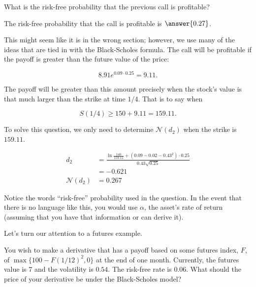 \documentclass{ximera}
\begin{document}
\begin{question}
What is the risk-free probability that the previous call is profitable?

The risk-free probability that the call is profitable is $\answer{0.27}$.
\end{question}

\begin{solution}
This might seem like it is in the wrong section; however, we use many of the ideas that are tied in with the Black-Scholes formula. The call will be profitable if the payoff is greater than the future value of the price:

	\begin{equation*}
	8.91e^{0.09\cdot 0.25}=9.11.
	\end{equation*}

The payoff will be greater than this amount precisely when the stock's value is that much larger than the strike at time $1/4$. That is to say when
	
	\begin{equation*}
	S(1/4)\geq 150+9.11=159.11.
	\end{equation*}

To solve this question, we only need to determine $\mathcal{N}(d_2)$ when the strike is $159.11$.

	\begin{align*}
	d_2 			&=\frac{\ln\frac{140}{159.11}+(0.09-0.02-0.43^2)\cdot 0.25}{0.43\sqrt{0.25}}\\
				&=-0.621\\
	\mathcal{N}(d_2) 	&=0.267
	\end{align*}
\end{solution}

Notice the words ``risk-free'' probability used in the question. In the event that there is no language like this, you would use $\alpha$, the asset's rate of return (assuming that you have that information or can derive it). 

Let's turn our attention to a futures example.

\begin{example}
You wish to make a derivative that has a payoff based on some futures index, $F$, of $\max\{100-F(1/12)^2,0\}$ at the end of one month. Currently, the futures value is $7$ and the volatility is $0.54$. The risk-free rate is $0.06$. What should the price of your derivative be under the Black-Scholes model?
\end{example}
\end{document}

